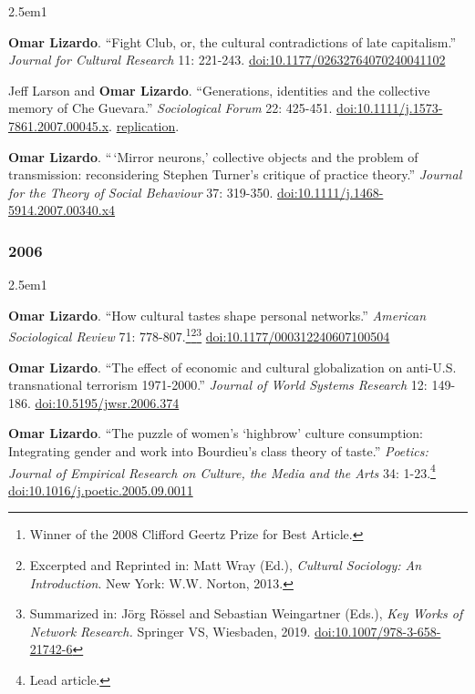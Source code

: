 \documentclass[
]{article}
\newenvironment{cventry}{\begin{hangparas}{2.5em}{1}}{\end{hangparas}}
\begin{document}
\begin{cventry}

\textbf{Omar Lizardo}. ``Fight Club, or, the cultural contradictions of
late capitalism.'' \emph{Journal for Cultural Research} 11: 221-243.
\href{https://doi.org/10.1177/02632764070240041102}{doi:10.1177/02632764070240041102}

Jeff Larson and \textbf{Omar Lizardo}. ``Generations, identities and the
collective memory of Che Guevara.'' \emph{Sociological Forum} 22:
425-451.
\href{https://doi.org/10.1111/j.1573-7861.2007.00045.x}{doi:10.1111/j.1573-7861.2007.00045.x}.
\href{https://github.com/olizardo/che-guevara-collective-memory}{
replication}.

\textbf{Omar Lizardo}. ``\,`Mirror neurons,' collective objects and the
problem of transmission: reconsidering Stephen Turner's critique of
practice theory.'' \emph{Journal for the Theory of Social Behaviour} 37:
319-350.
\href{https://doi.org/10.1111/j.1468-5914.2007.00340.x4}{doi:10.1111/j.1468-5914.2007.00340.x4}

\end{cventry}

\subsubsection{2006}\label{section-13}

\begin{cventry}

\textbf{Omar Lizardo}. ``How cultural tastes shape personal networks.''
\emph{American Sociological Review} 71:
778-807.\footnote{Winner of the 2008 Clifford Geertz Prize for Best
  Article.}\footnote{Excerpted and Reprinted in: Matt Wray (Ed.),
  \emph{Cultural Sociology: An Introduction}. New York: W.W. Norton,
  2013.}\footnote{Summarized in: Jörg Rössel and Sebastian Weingartner
  (Eds.), \emph{Key Works of Network Research.} Springer VS, Wiesbaden,
  2019.
  \href{https://doi.org/10.1007/978-3-658-21742-6}{doi:10.1007/978-3-658-21742-6}}
\href{https://doi.org/10.1177/000312240607100504}{doi:10.1177/000312240607100504}

\textbf{Omar Lizardo}. ``The effect of economic and cultural
globalization on anti-U.S. transnational terrorism 1971-2000.''
\emph{Journal of World Systems Research} 12: 149-186.
\href{https://doi.org/10.5195/jwsr.2006.374}{doi:10.5195/jwsr.2006.374}

\textbf{Omar Lizardo}. ``The puzzle of women's `highbrow' culture
consumption: Integrating gender and work into Bourdieu's class theory of
taste.'' \emph{Poetics: Journal of Empirical Research on Culture, the
Media and the Arts} 34: 1-23.\footnote{Lead article.}
\href{https://doi.org/10.1016/j.poetic.2005.09.001}{doi:10.1016/j.poetic.2005.09.0011}

\end{cventry}
\end{document}
